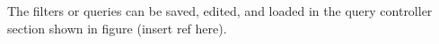 The filters or queries can be saved, edited, and loaded in the query controller section shown in figure (insert ref here). 